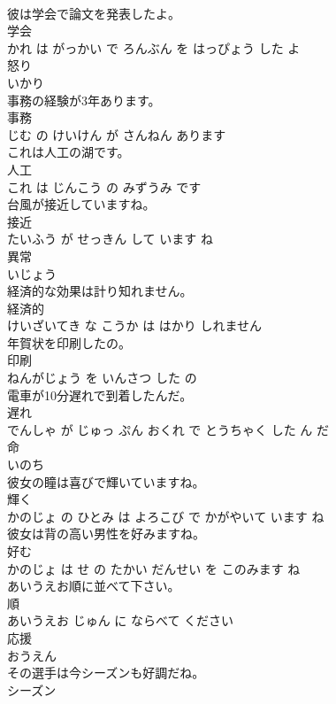 \documentclass[8pt]{extreport}
\begin{document}
\begin{CJK}{UTF8}{min}
\\	彼は学会で論文を発表したよ。	
\\	学会 
\\	かれ は がっかい で ろんぶん を はっぴょう した よ			
\\	怒り	
\\	いかり			
\\	事務の経験が3年あります。	
\\	事務 
\\	じむ の けいけん が さんねん あります			
\\	これは人工の湖です。	
\\	人工 
\\	これ は じんこう の みずうみ です			
\\	台風が接近していますね。	
\\	接近 
\\	たいふう が せっきん して います ね			
\\	異常	
\\	いじょう			
\\	経済的な効果は計り知れません。	
\\	経済的 
\\	けいざいてき な こうか は はかり しれません			
\\	年賀状を印刷したの。	
\\	印刷 
\\	ねんがじょう を いんさつ した の			
\\	電車が10分遅れで到着したんだ。	
\\	遅れ 
\\	でんしゃ が じゅっ ぷん おくれ で とうちゃく した ん だ			
\\	命	
\\	いのち			
\\	彼女の瞳は喜びで輝いていますね。	
\\	輝く 
\\	かのじょ の ひとみ は よろこび で かがやいて います ね			
\\	彼女は背の高い男性を好みますね。	
\\	好む 
\\	かのじょ は せ の たかい だんせい を このみます ね			
\\	あいうえお順に並べて下さい。	
\\	順 
\\	あいうえお じゅん に ならべて ください			
\\	応援	
\\	おうえん			
\\	その選手は今シーズンも好調だね。	
\\	シーズン 

\end{CJK}
\end{document}
